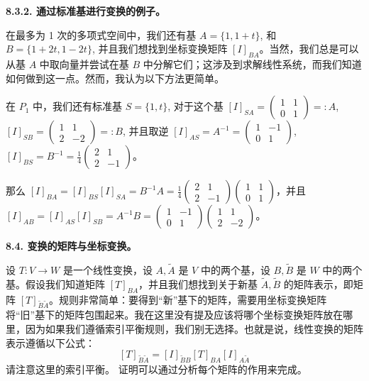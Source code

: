 \textbf{8.3.2. 通过标准基进行变换的例子。}

在最多为 1 次的多项式空间中，我们还有基 $A = \{1, 1+t\}$, 和 $B = \{1+2t, 1-2t\}$, 并且我们想找到坐标变换矩阵 $[I]_{BA}$。当然，我们总是可以从基 $A$ 中取向量并尝试在基 $B$ 中分解它们；这涉及到求解线性系统，而我们知道如何做到这一点。然而，我认为以下方法更简单。

在 $P_1$ 中，我们还有标准基 $S = \{1, t\}$, 对于这个基 $[I]_{SA} = \begin{pmatrix} 1 & 1 \\ 0 & 1 \end{pmatrix} =: A$, $[I]_{SB} = \begin{pmatrix} 1 & 1 \\ 2 & -2 \end{pmatrix} =: B$, 并且取逆 $[I]_{AS} = A^{-1} = \begin{pmatrix} 1 & -1 \\ 0 & 1 \end{pmatrix}$, $[I]_{BS} = B^{-1} = \frac{1}{4} \begin{pmatrix} 2 & 1 \\ 2 & -1 \end{pmatrix}$。

那么 $[I]_{BA} = [I]_{BS} [I]_{SA} = B^{-1} A = \frac{1}{4} \begin{pmatrix} 2 & 1 \\ 2 & -1 \end{pmatrix} \begin{pmatrix} 1 & 1 \\ 0 & 1 \end{pmatrix}$，并且
$[I]_{AB} = [I]_{AS} [I]_{SB} = A^{-1} B = \begin{pmatrix} 1 & -1 \\ 0 & 1 \end{pmatrix} \begin{pmatrix} 1 & 1 \\ 2 & -2 \end{pmatrix}$。

\textbf{8.4. 变换的矩阵与坐标变换。}

设 $T: V \to W$ 是一个线性变换，设 $A, \tilde{A}$ 是 $V$ 中的两个基，设 $B, \tilde{B}$ 是 $W$ 中的两个基。假设我们知道矩阵 $[T]_{BA}$，并且我们想找到关于新基 $\tilde{A}, \tilde{B}$ 的矩阵表示，即矩阵 $[T]_{\tilde{B}\tilde{A}}$。规则非常简单：要得到“新”基下的矩阵，需要用坐标变换矩阵将“旧”基下的矩阵包围起来。我在这里没有提及应该将哪个坐标变换矩阵放在哪里，因为如果我们遵循索引平衡规则，我们别无选择。也就是说，线性变换的矩阵表示遵循以下公式：
$$
[T]_{\tilde{B}\tilde{A}} = [I]_{\tilde{B}B} [T]_{BA} [I]_{A\tilde{A}}
$$
请注意这里的索引平衡。
证明可以通过分析每个矩阵的作用来完成。

